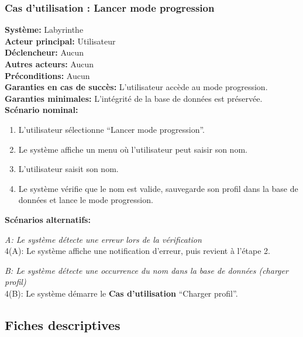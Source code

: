 \documentclass{butexFR}
\begin{document}
\subsubsection{Cas d'utilisation : Lancer mode progression}
\textbf{Système:} Labyrinthe\\
\textbf{Acteur principal:} Utilisateur\\
\textbf{Déclencheur:} Aucun\\
\textbf{Autres acteurs:} Aucun\\
\textbf{Préconditions:} Aucun\\
\textbf{Garanties en cas de succès:} L'utilisateur accède au mode progression.\\
\textbf{Garanties minimales:} L'intégrité de la base de données est préservée.\\
\textbf{Scénario nominal:}
\begin{enumerate}
    \item L'utilisateur sélectionne ``Lancer mode progression''.
    \item Le système affiche un menu où l'utilisateur peut saisir son nom.
    \item L'utilisateur saisit son nom.
    \item Le système vérifie que le nom est valide, sauvegarde son profil dans la base de données et lance le mode progression.
\end{enumerate}
\textbf{Scénarios alternatifs:}

\emph{A: Le système détecte une erreur lors de la vérification}\\
\hspace*{1em}4(A): Le système affiche une notification d'erreur, puis revient à l'étape 2.

\emph{B: Le système détecte une occurrence du nom dans la base de données (charger profil)}\\
\hspace*{1em}4(B): Le système démarre le \textbf{Cas d'utilisation} ``Charger profil''.

\newpage

\subsection{Fiches descriptives}
\end{document}
